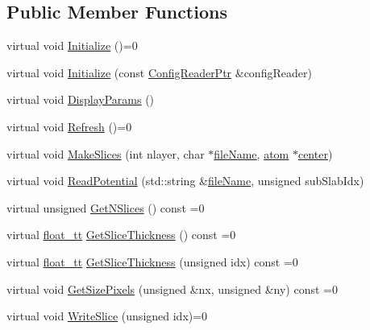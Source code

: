 \subsection*{Public Member Functions}
\begin{DoxyCompactItemize}
\item 
virtual void \hyperlink{class_q_s_t_e_m_1_1_i_potential_ae70d5124abd2e172a36cdab52dfdcea4}{Initialize} ()=0
\item 
virtual void \hyperlink{class_q_s_t_e_m_1_1_i_potential_a652b4c33efbf970f2b920a39bb2d2d23}{Initialize} (const \hyperlink{namespace_q_s_t_e_m_af9424707fe9f6503298f49b41304bd35}{Config\-Reader\-Ptr} \&config\-Reader)
\item 
virtual void \hyperlink{class_q_s_t_e_m_1_1_i_potential_a4f9d118be7decf1cc12eee493dccd33c}{Display\-Params} ()
\item 
virtual void \hyperlink{class_q_s_t_e_m_1_1_i_potential_a28940011cfb3b0903e99acf1a17171a8}{Refresh} ()=0
\item 
virtual void \hyperlink{class_q_s_t_e_m_1_1_i_potential_a77bf71defbd2f1428aafcc61e81218ec}{Make\-Slices} (int nlayer, char $\ast$\hyperlink{qmb_8m_a7a230f02bdffebd1357e3c0b49e01271}{file\-Name}, \hyperlink{namespace_q_s_t_e_m_a402dabc31a7a1fe906d0cdd138c69686}{atom} $\ast$\hyperlink{_displacement_params_8m_a02389a9bda512aa8f8a3345f4fa27f25}{center})
\item 
virtual void \hyperlink{class_q_s_t_e_m_1_1_i_potential_a7b9b1d1836dd849964055013d9bd2078}{Read\-Potential} (std\-::string \&\hyperlink{qmb_8m_a7a230f02bdffebd1357e3c0b49e01271}{file\-Name}, unsigned sub\-Slab\-Idx)
\item 
virtual unsigned \hyperlink{class_q_s_t_e_m_1_1_i_potential_a6d0c56412a833bd5bac6789406e7f64d}{Get\-N\-Slices} () const =0
\item 
virtual \hyperlink{namespace_q_s_t_e_m_a915d7caa497280d9f927c4ce8d330e47}{float\-\_\-tt} \hyperlink{class_q_s_t_e_m_1_1_i_potential_aad0012872c9d03000c273a16d164c595}{Get\-Slice\-Thickness} () const =0
\item 
virtual \hyperlink{namespace_q_s_t_e_m_a915d7caa497280d9f927c4ce8d330e47}{float\-\_\-tt} \hyperlink{class_q_s_t_e_m_1_1_i_potential_ac28c65dec37200a54ccc8b2c41375eb2}{Get\-Slice\-Thickness} (unsigned idx) const =0
\item 
virtual void \hyperlink{class_q_s_t_e_m_1_1_i_potential_a6cee19e6abbe5d31ffe8914d2f65d6de}{Get\-Size\-Pixels} (unsigned \&nx, unsigned \&ny) const =0
\item 
virtual void \hyperlink{class_q_s_t_e_m_1_1_i_potential_a539c0e6e9a194893be78a7192a767a12}{Write\-Slice} (unsigned idx)=0

\end{DoxyCompactItemize}
